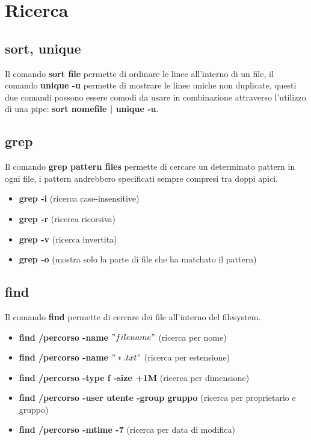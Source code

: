 \documentclass[oneside,a4paper,11pt]{book}
\theoremstyle{italicstyle}
\theoremstyle{normStyle}
\begin{document}
\section{Ricerca}
\subsection{sort, unique}
Il comando \textbf{sort file} permette di ordinare le linee all'interno di un file, il comando \textbf{unique -u} permette di mostrare le linee uniche non duplicate, questi due comandi possono essere comodi da usare in combinazione attraverso l'utilizzo di una pipe: \textbf{sort nomefile | unique -u}.

\subsection{grep}
Il comando \textbf{grep pattern files} permette di cercare un determinato pattern in ogni file, i pattern andrebbero specificati sempre compresi tra doppi apici.

\begin{itemize}
    \item \textbf{grep -i } (ricerca case-insensitive)
    \item \textbf{grep -r } (ricerca ricorsiva)
    \item \textbf{grep -v } (ricerca invertita)
    \item \textbf{grep -o } (mostra solo la parte di file che ha matchato il pattern)
\end{itemize}

\subsection{find}
Il comando \textbf{find} permette di cercare dei file all'interno del filesystem.

\begin{itemize}
    \item \textbf{find /percorso -name $"filename"$} (ricerca per nome)
    \item \textbf{find /percorso -name $"*.txt"$} (ricerca per estensione)
    \item \textbf{find /percorso -type f -size +1M} (ricerca per dimensione)
    \item \textbf{find /percorso -user utente -group gruppo} (ricerca per proprietario e gruppo)
    \item \textbf{find /percorso -mtime -7} (ricerca per data di modifica)
\end{itemize}
\end{document}
